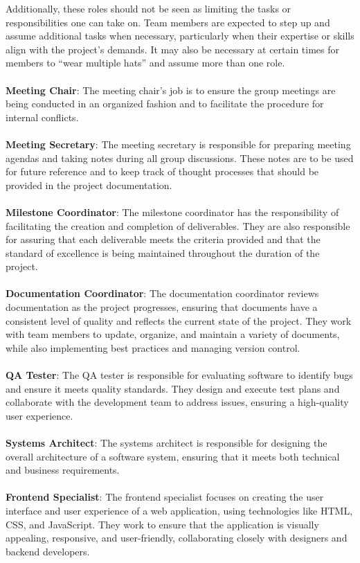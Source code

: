 \documentclass{article}
\begin{document}
Additionally, these roles should not be seen as limiting the tasks or responsibilities one can take on. Team members are expected to step up and assume additional tasks when necessary, particularly when their expertise or skills align with the project’s demands. It may also be necessary at certain times for members to “wear multiple hats” and assume more than one role.
\\
\\
\textbf{Meeting Chair}: The meeting chair’s job is to ensure the group meetings are being conducted in an organized fashion and to facilitate the procedure for internal conflicts.
\\
\\
\textbf{Meeting Secretary}: The meeting secretary is responsible for preparing meeting agendas and taking notes during all group discussions. These notes are to be used for future reference and to keep track of thought processes that should be provided in the project documentation.
\\
\\
\textbf{Milestone Coordinator}: The milestone coordinator has the responsibility of facilitating the creation and completion of deliverables. They are also responsible for assuring that each deliverable meets the criteria provided and that the standard of excellence is being maintained throughout the duration of the project.
\\
\\
\textbf{Documentation Coordinator}: The documentation coordinator reviews documentation as the project progresses, ensuring that documents have a consistent level of quality and reflects the current state of the project. They work with team members to update, organize, and maintain a variety of documents, while also implementing best practices and managing version control.
\\
\\
\textbf{QA Tester}: The QA tester is responsible for evaluating software to identify bugs and ensure it meets quality standards. They design and execute test plans and collaborate with the development team to address issues, ensuring a high-quality user experience.
\\
\\
\textbf{Systems Architect}: The systems architect is responsible for designing the overall architecture of a software system, ensuring that it meets both technical and business requirements.
\\
\\
\textbf{Frontend Specialist}: The frontend specialist focuses on creating the user interface and user experience of a web application, using technologies like HTML, CSS, and JavaScript. They work to ensure that the application is visually appealing, responsive, and user-friendly, collaborating closely with designers and backend developers.
\end{document}
